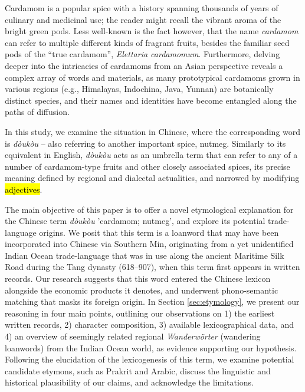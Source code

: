\documentclass[12pt]{article}
\newcommand{\tc}[1]{\traditionalchinesefont{#1}\rmfamily}
\begin{document}
Cardamom is a popular spice with a history spanning thousands of years of culinary and medicinal use; the reader might recall the vibrant aroma of the bright green pods. Less well-known is the fact however, that the name \textit{cardamom} can refer to multiple different kinds of fragrant fruits, besides the familiar seed pods of the ``true cardamom'', \textit{Elettaria cardamomum}. Furthermore, delving deeper into the intricacies of cardamoms from an Asian perspective reveals a complex array of words and materials, as many prototypical cardamoms grown in various regions (e.g., Himalayas, Indochina, Java, Yunnan) are botanically distinct species, and their names and identities have become entangled along the paths of diffusion.

In this study, we examine the situation in Chinese, where the corresponding word is \tc{豆蔻} \textit{dòukòu} -- also referring to another important spice, nutmeg. Similarly to its equivalent in English, \textit{dòukòu} acts as an umbrella term that can refer to any of a number of cardamom-type fruits and other closely associated spices, its precise meaning defined by regional and dialectal actualities, and narrowed by modifying \hl{adjectives}.

The main objective of this paper is to offer a novel etymological explanation for the Chinese term \tc{豆蔻} \textit{dòukòu} 'cardamom; nutmeg', and explore its potential trade-language origins. We posit that this term is a loanword that may have been incorporated into Chinese via Southern Min, originating from a yet unidentified Indian Ocean trade-language that was in use along the ancient Maritime Silk Road during the Tang dynasty (618--907), when this term first appears in written records. Our research suggests that this word entered the Chinese lexicon alongside the economic products it denotes, and underwent phono-semantic matching that masks its foreign origin. In Section \ref{sec:etymology}, we present our reasoning in four main points, outlining our observations on 1) the earliest written records, 2) character composition, 3) available lexicographical data, and 4) an overview of seemingly related regional \textit{Wanderwörter} (wandering loanwords) from the Indian Ocean world, as evidence supporting our hypothesis. Following the elucidation of the lexicogenesis of this term, we examine potential candidate etymons, such as Prakrit and Arabic, discuss the linguistic and historical plausibility of our claims, and acknowledge the limitations.

\end{document}
